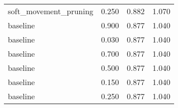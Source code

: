 \begin{tabular}{lrrr}
soft\_movement\_pruning &   0.250 &          0.882 &      1.070 \\
             baseline &   0.900 &          0.877 &      1.040 \\
             baseline &   0.030 &          0.877 &      1.040 \\
             baseline &   0.700 &          0.877 &      1.040 \\
             baseline &   0.500 &          0.877 &      1.040 \\
             baseline &   0.150 &          0.877 &      1.040 \\
             baseline &   0.250 &          0.877 &      1.040 \\
\bottomrule
\end{tabular}
